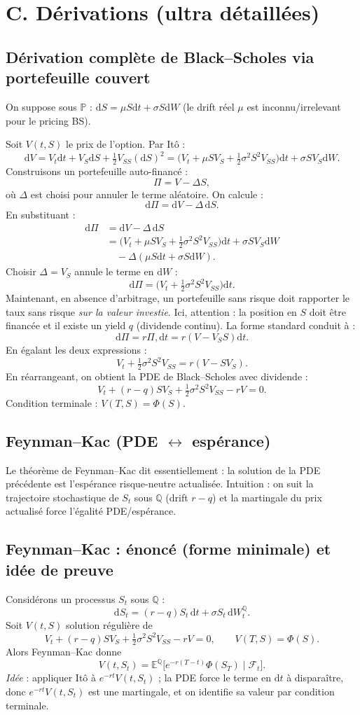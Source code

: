 \documentclass[11pt,a4paper]{report}
\theoremstyle{definition}
\theoremstyle{plain}
\theoremstyle{remark}
\newcommand{\dd}{\mathrm{d}}
\newcommand{\E}{\mathbb{E}}
\newcommand{\1}{\mathbf{1}}
\newcommand{\Pmeas}{\mathbb{P}}
\newcommand{\Qmeas}{\mathbb{Q}}
\newcommand{\F}{\mathcal{F}}
\begin{document}
\section{C. Dérivations (ultra détaillées)}
\subsection*{Dérivation complète de Black--Scholes via portefeuille couvert}
On suppose sous $\Pmeas$ : $\dd S=\mu S\dd t+\sigma S\dd W$ (le drift réel $\mu$ est inconnu/irrelevant pour le pricing BS).

Soit $V(t,S)$ le prix de l'option. Par Itô :
\[
\dd V = V_t \dd t + V_S \dd S + \tfrac12 V_{SS}(\dd S)^2
= \Big(V_t+\mu S V_S+\tfrac12\sigma^2 S^2 V_{SS}\Big)\dd t + \sigma S V_S \dd W.
\]
Construisons un portefeuille auto-financé :
\[
\Pi = V - \Delta S,
\]
où $\Delta$ est choisi pour annuler le terme aléatoire. On calcule :
\[
\dd \Pi = \dd V - \Delta\,\dd S.
\]
En substituant :
\[
\begin{aligned}
\dd \Pi &= \dd V - \Delta\,\dd S\\
&= \Big(V_t+\mu S V_S+\tfrac12\sigma^2 S^2 V_{SS}\Big)\dd t + \sigma S V_S \dd W\\
&\quad - \Delta(\mu S\dd t+\sigma S\dd W).
\end{aligned}
\]
Choisir $\Delta=V_S$ annule le terme en $\dd W$ :
\[
\dd \Pi = \Big(V_t+\tfrac12\sigma^2 S^2 V_{SS}\Big)\dd t.
\]
Maintenant, en absence d'arbitrage, un portefeuille sans risque doit rapporter le taux sans risque \emph{sur la valeur investie}. Ici, attention : la position en $S$ doit être financée et il existe un yield $q$ (dividende continu). La forme standard conduit à :
\[
\dd \Pi = r\Pi,\dd t = r(V - V_S S)\dd t.
\]
En égalant les deux expressions :
\[
V_t+\tfrac12\sigma^2 S^2 V_{SS}=r(V - S V_S).
\]
En réarrangeant, on obtient la PDE de Black--Scholes avec dividende :
\[
\boxed{V_t + (r-q)S V_S + \tfrac12\sigma^2 S^2 V_{SS} - rV = 0.}
\]
Condition terminale : $V(T,S)=\Phi(S)$.
\subsection*{Feynman--Kac (PDE $\leftrightarrow$ espérance)}
Le théorème de Feynman--Kac dit essentiellement : la solution de la PDE précédente est l'espérance risque-neutre actualisée. Intuition : on suit la trajectoire stochastique de $S_t$ sous $\Qmeas$ (drift $r-q$) et la martingale du prix actualisé force l'égalité PDE/espérance.

\subsection*{Feynman--Kac : énoncé (forme minimale) et idée de preuve}
Considérons un processus $S_t$ sous $\Qmeas$ :
\[
\dd S_t=(r-q)S_t\,\dd t+\sigma S_t\,\dd W_t^{\Qmeas}.
\]
Soit $V(t,S)$ solution régulière de
\[
V_t+(r-q)SV_S+\tfrac12\sigma^2S^2V_{SS}-rV=0,\qquad V(T,S)=\Phi(S).
\]
Alors Feynman--Kac donne
\[
V(t,S_t)=\E^{\Qmeas}\big[e^{-r(T-t)}\Phi(S_T)\mid \F_t\big].
\]
\emph{Idée} : appliquer Itô à $e^{-rt}V(t,S_t)$ ; la PDE force le terme en $\dd t$ à disparaître, donc $e^{-rt}V(t,S_t)$ est une martingale, et on identifie sa valeur par condition terminale.
\end{document}
